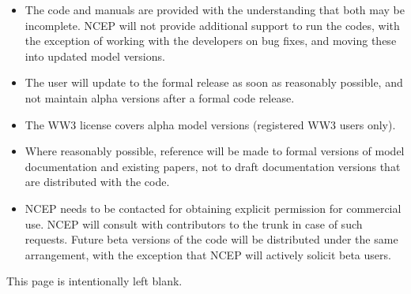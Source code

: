 \documentclass[12pt]{article}
\newcommand{\pb}{\strut \vfill \pagebreak}
\newcommand{\bpage}{\vfill \pagebreak \strut

\vspace{2.5in} \centerline{This page is intentionally left blank.}}
\newcommand{\bpagea}{\strut

\vspace{2.5in} \centerline{This page is intentionally left blank.}}
\begin{document}
\begin{itemize}
\item The code and manuals are provided with the understanding that both may
  be incomplete. NCEP will not provide additional support to run the codes,
  with the exception of working with the developers on bug fixes, and moving
  these into updated model versions.
\item The user will update to the formal release as soon as reasonably
  possible, and not maintain alpha versions after a formal code release.
\item The WW3 license covers alpha model versions (registered WW3 users only).
\item Where reasonably possible, reference will be made to formal versions of
  model documentation and existing papers, not to draft documentation versions
  that are distributed with the code.
\item NCEP needs to be contacted for obtaining explicit permission for
  commercial use. NCEP will consult with contributors to the trunk in case of
  such requests.  Future beta versions of the code will be distributed under
  the same arrangement, with the exception that NCEP will actively solicit
  beta users.
\end{itemize}


\pb
{}
\setcounter{footnote}{0}


%



\pb
\pagestyle{empty}
\bpagea
\end{document}
